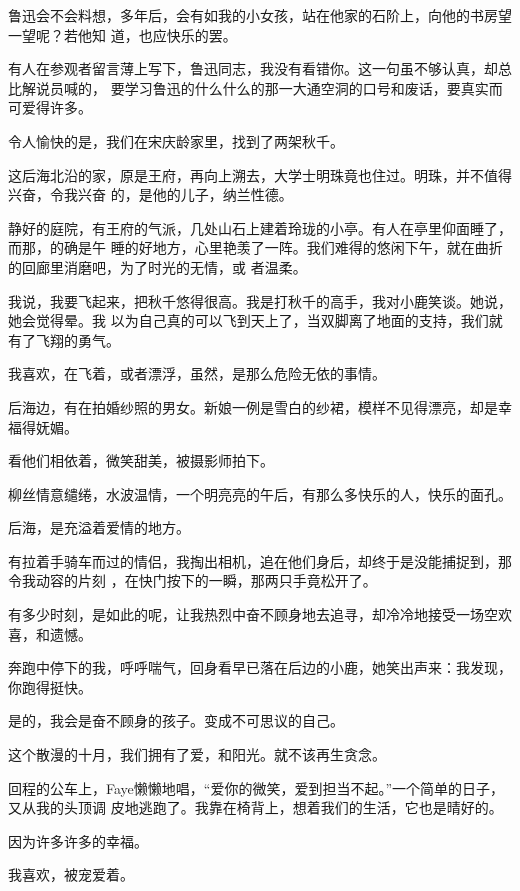 \documentclass[12pt,a4paper]{article}
\begin{document}
		鲁迅会不会料想，多年后，会有如我的小女孩，站在他家的石阶上，向他的书房望一望呢？若他知
	道，也应快乐的罢。


		有人在参观者留言薄上写下，鲁迅同志，我没有看错你。这一句虽不够认真，却总比解说员喊的，
	要学习鲁迅的什么什么的那一大通空洞的口号和废话，要真实而可爱得许多。


		令人愉快的是，我们在宋庆龄家里，找到了两架秋千。

		这后海北沿的家，原是王府，再向上溯去，大学士明珠竟也住过。明珠，并不值得兴奋，令我兴奋
	的，是他的儿子，纳兰性德。

		静好的庭院，有王府的气派，几处山石上建着玲珑的小亭。有人在亭里仰面睡了，而那，的确是午
	睡的好地方，心里艳羡了一阵。我们难得的悠闲下午，就在曲折的回廊里消磨吧，为了时光的无情，或
	者温柔。

		我说，我要飞起来，把秋千悠得很高。我是打秋千的高手，我对小鹿笑谈。她说，她会觉得晕。我
	以为自己真的可以飞到天上了，当双脚离了地面的支持，我们就有了飞翔的勇气。

		我喜欢，在飞着，或者漂浮，虽然，是那么危险无依的事情。


		后海边，有在拍婚纱照的男女。新娘一例是雪白的纱裙，模样不见得漂亮，却是幸福得妩媚。

		看他们相依着，微笑甜美，被摄影师拍下。

		柳丝情意缱绻，水波温情，一个明亮亮的午后，有那么多快乐的人，快乐的面孔。

		后海，是充溢着爱情的地方。

		有拉着手骑车而过的情侣，我掏出相机，追在他们身后，却终于是没能捕捉到，那令我动容的片刻
	，在快门按下的一瞬，那两只手竟松开了。

		有多少时刻，是如此的呢，让我热烈中奋不顾身地去追寻，却冷冷地接受一场空欢喜，和遗憾。

		奔跑中停下的我，呼呼喘气，回身看早已落在后边的小鹿，她笑出声来：我发现，你跑得挺快。

		是的，我会是奋不顾身的孩子。变成不可思议的自己。


		这个散漫的十月，我们拥有了爱，和阳光。就不该再生贪念。

		回程的公车上，Faye懒懒地唱，“爱你的微笑，爱到担当不起。”一个简单的日子，又从我的头顶调
	皮地逃跑了。我靠在椅背上，想着我们的生活，它也是晴好的。


		因为许多许多的幸福。

		我喜欢，被宠爱着。

	\endwriting


\end{document}
